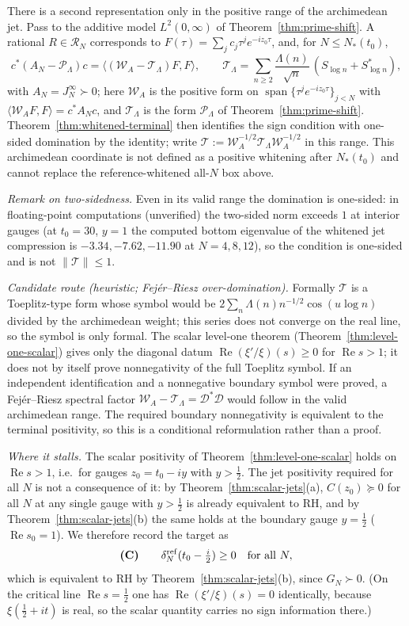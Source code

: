 \documentclass[11pt]{amsart}
\theoremstyle{definition}
\theoremstyle{remark}
\theoremstyle{definition}
\renewcommand{\Re}{\operatorname{Re}}
\newcommand{\half}{\tfrac{1}{2}}
\begin{document}
There is a second representation only in the positive range of the archimedean jet.  Pass to the
additive model $L^2(0,\infty)$ of Theorem~\ref{thm:prime-shift}.  A rational
$R\in\mathcal R_N$ corresponds to $F(\tau)=\sum_jc_j\tau^je^{-iz_0\tau}$, and, for
$N\le N_*(t_0)$,
\[
   c^*(A_N-\mathcal P_\Lambda)c
   =\langle(\mathcal W_A-\mathcal T_\Lambda)F,F\rangle,
   \qquad
   \mathcal T_\Lambda=\sum_{n\ge2}\frac{\Lambda(n)}{\sqrt n}\,(S_{\log n}+S_{\log n}^*),
\]
with $A_N=J_N^\infty\succ0$; here $\mathcal W_A$ is the positive form on
$\operatorname{span}\{\tau^je^{-iz_0\tau}\}_{j<N}$ with $\langle\mathcal W_AF,F\rangle=c^*A_Nc$, and
$\mathcal T_\Lambda$ is the form $\mathcal P_\Lambda$ of Theorem~\ref{thm:prime-shift}.  Theorem~\ref{thm:whitened-terminal} then identifies the sign condition
with one-sided domination by the identity; write
$\mathcal T:=\mathcal W_A^{-1/2}\mathcal T_\Lambda\mathcal W_A^{-1/2}$ in this range.  This
archimedean coordinate is not defined as a positive
whitening after $N_*(t_0)$ and cannot replace the reference-whitened all-$N$ box above.

\emph{Remark on two-sidedness.}  Even in its valid range the domination is one-sided: in
floating-point computations (unverified) the two-sided norm exceeds $1$ at interior gauges (at
$t_0=30$, $y=1$ the computed bottom eigenvalue of the whitened jet compression is
$-3.34,-7.62,-11.90$ at $N=4,8,12$), so the condition is one-sided and is not $\|\mathcal T\|\le1$.

\emph{Candidate route (heuristic; Fej\'er--Riesz over-domination).}  Formally $\mathcal T$ is a
Toeplitz-type form whose symbol would be $2\sum_n\Lambda(n)n^{-1/2}\cos(u\log n)$ divided by the
archimedean weight; this series does not converge on the real line, so the symbol is only formal.  The scalar level-one
theorem (Theorem~\ref{thm:level-one-scalar}) gives only the diagonal datum
$\Re(\xi'/\xi)(s)\ge0$ for $\Re s>1$; it does not by itself prove nonnegativity of the full Toeplitz
symbol.  If an independent identification and a nonnegative boundary symbol were proved, a
Fej\'er--Riesz spectral factor
$\mathcal W_A-\mathcal T_\Lambda=\mathcal D^*\mathcal D$ would follow in the valid archimedean range.
The required boundary nonnegativity is equivalent to the terminal positivity, so this is a conditional
reformulation rather than a proof.

\emph{Where it stalls.}  The scalar positivity of Theorem~\ref{thm:level-one-scalar} holds on
$\Re s>1$, i.e.\ for gauges $z_0=t_0-iy$ with $y>\half$.  The jet positivity required for all $N$ is
not a consequence of it: by Theorem~\ref{thm:scalar-jets}(a), $C(z_0)\succeq0$ for all $N$ at any
single gauge with $y>\half$ is already equivalent to RH, and by Theorem~\ref{thm:scalar-jets}(b) the
same holds at the boundary gauge $y=\half$ ($\Re s_0=1$).  We therefore record the target as
\[
   \textbf{(C)}\qquad \delta_N^{\rm ref}(t_0-\tfrac i2)\ge0\quad\text{for all }N,
\]
which is equivalent to RH by Theorem~\ref{thm:scalar-jets}(b), since $G_N\succ0$.  (On the critical
line $\Re s=\half$ one has $\Re(\xi'/\xi)(s)=0$ identically, because $\xi(\half+it)$ is real, so the
scalar quantity carries no sign information there.)
\end{document}
